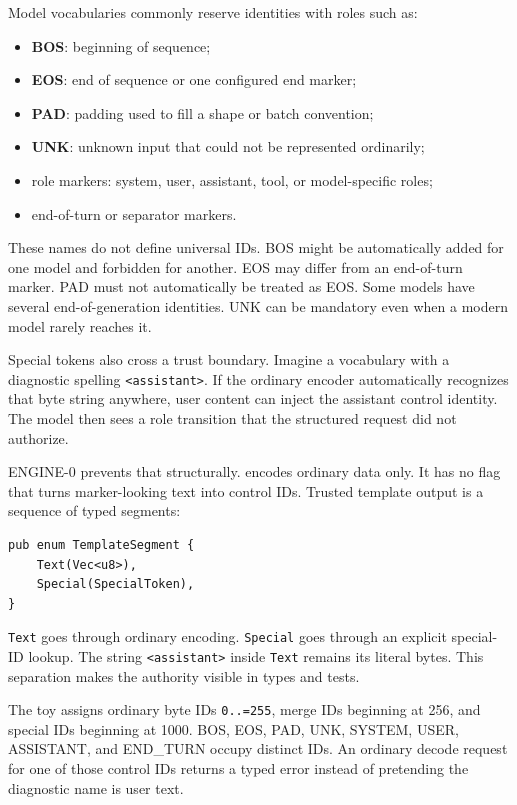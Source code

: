 Model vocabularies commonly reserve identities with roles such as:

\begin{itemize}
\tightlist
\item
  \textbf{BOS}: beginning of sequence;
\item
  \textbf{EOS}: end of sequence or one configured end marker;
\item
  \textbf{PAD}: padding used to fill a shape or batch convention;
\item
  \textbf{UNK}: unknown input that could not be represented ordinarily;
\item
  role markers: system, user, assistant, tool, or model-specific roles;
\item
  end-of-turn or separator markers.
\end{itemize}

These names do not define universal IDs. BOS might be automatically
added for one model and forbidden for another. EOS may differ from an
end-of-turn marker. PAD must not automatically be treated as EOS. Some
models have several end-of-generation identities. UNK can be mandatory
even when a modern model rarely reaches it.

Special tokens also cross a trust boundary. Imagine a vocabulary with a
diagnostic spelling
\texttt{\textless{}\textbar{}assistant\textbar{}\textgreater{}}. If the
ordinary encoder automatically recognizes that byte string anywhere,
user content can inject the assistant control identity. The model then
sees a role transition that the structured request did not authorize.

ENGINE-0 prevents that structurally.
\texttt{} encodes ordinary data
only. It has no flag that turns marker-looking text into control IDs.
Trusted template output is a sequence of typed segments:

\begin{verbatim}
pub enum TemplateSegment {
    Text(Vec<u8>),
    Special(SpecialToken),
}
\end{verbatim}

\texttt{Text} goes through ordinary encoding. \texttt{Special} goes
through an explicit special-ID lookup. The string
\texttt{\textless{}\textbar{}assistant\textbar{}\textgreater{}} inside
\texttt{Text} remains its literal bytes. This separation makes the
authority visible in types and tests.

The toy assigns ordinary byte IDs \texttt{0..=255}, merge IDs beginning
at 256, and special IDs beginning at 1000. BOS, EOS, PAD, UNK, SYSTEM,
USER, ASSISTANT, and END\_TURN occupy distinct IDs. An ordinary decode
request for one of those control IDs returns a typed error instead of
pretending the diagnostic name is user text.

